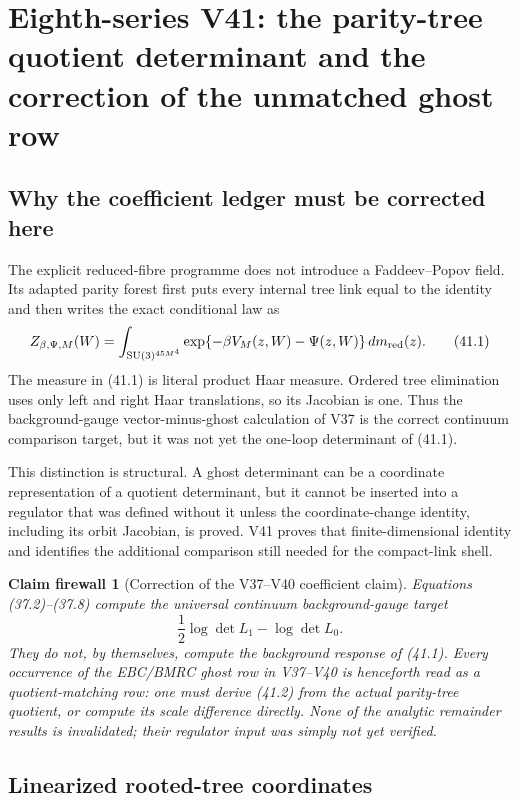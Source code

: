 \documentclass[11pt,oneside]{book}
\newtheorem{firewall}[theorem]{Claim firewall}
\theoremstyle{definition}
\theoremstyle{remark}
\begin{document}
\section{Eighth-series V41: the parity-tree quotient determinant and the
correction of the unmatched ghost row}
\label{sec:e8v41}

\subsection{Why the coefficient ledger must be corrected here}

The explicit reduced-fibre programme does not introduce a
Faddeev--Popov field.  Its adapted parity forest first puts every
internal tree link equal to the identity and then writes the exact
conditional law as
\[
 Z_{\beta,\Psi,M}(W)
 =\int_{{\rm SU}(3)^{45M^4}}
       \exp\{-\beta V_M(z,W)-\Psi(z,W)\}\,dm_{\rm red}(z).       \tag{41.1}
\]
The measure in (41.1) is literal product Haar measure.  Ordered
tree elimination uses only left and right Haar translations, so its
Jacobian is one.  Thus the background-gauge vector-minus-ghost
calculation of V37 is the correct continuum comparison target, but
it was not yet the one-loop determinant of (41.1).

This distinction is structural.  A ghost determinant can be a
coordinate representation of a quotient determinant, but it cannot
be inserted into a regulator that was defined without it unless the
coordinate-change identity, including its orbit Jacobian, is proved.
V41 proves that finite-dimensional identity and identifies the
additional comparison still needed for the compact-link shell.

\begin{firewall}[Correction of the V37--V40 coefficient claim]
\label{fire:e8v41-ghost-correction}
Equations (37.2)--(37.8) compute the universal continuum
background-gauge target
\[
 \frac12\log\det L_1-\log\det L_0.                              \tag{41.2}
\]
They do not, by themselves, compute the background response of
(41.1).  Every occurrence of the EBC/BMRC ghost row in
V37--V40 is henceforth read as a \emph{quotient-matching row}:
one must derive (41.2) from the actual parity-tree quotient, or
compute its scale difference directly.  None of the analytic
remainder results is invalidated; their regulator input was simply
not yet verified.
\end{firewall}

\subsection{Linearized rooted-tree coordinates}
\end{document}

